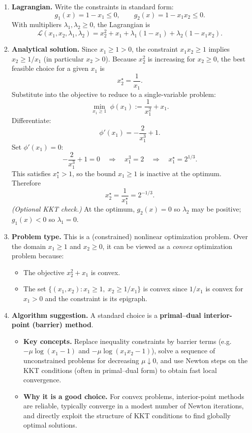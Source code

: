 \documentclass[11pt]{article}
\begin{document}
\begin{enumerate}[label=(\alph*)]

\item \textbf{Lagrangian.} Write the constraints in standard form:
\[
g_1(x)=1-x_1 \le 0,\qquad g_2(x)=1-x_1x_2 \le 0.
\]
With multipliers $\lambda_1,\lambda_2\ge 0$, the Lagrangian is
\[
\mathcal{L}(x_1,x_2,\lambda_1,\lambda_2)=x_2^2+x_1+\lambda_1(1-x_1)+\lambda_2(1-x_1x_2).
\]

\item \textbf{Analytical solution.} Since $x_1\ge 1>0$, the constraint $x_1x_2\ge 1$ implies $x_2\ge 1/x_1$ (in particular $x_2>0$). Because $x_2^2$ is increasing for $x_2\ge 0$, the best feasible choice for a given $x_1$ is
\[
x_2^\star=\frac{1}{x_1}.
\]
Substitute into the objective to reduce to a single-variable problem:
\[
\min_{x_1\ge 1}\; \phi(x_1):=\frac{1}{x_1^2}+x_1.
\]
Differentiate:
\[
\phi'(x_1)=-\frac{2}{x_1^3}+1.
\]
Set $\phi'(x_1)=0$:
\[
-\frac{2}{x_1^3}+1=0
\quad\Longrightarrow\quad
x_1^3=2
\quad\Longrightarrow\quad
x_1^\star=2^{1/3}.
\]
This satisfies $x_1^\star>1$, so the bound $x_1\ge 1$ is inactive at the optimum. Therefore
\[
x_2^\star=\frac{1}{x_1^\star}=2^{-1/3}.
\]
\emph{(Optional KKT check.)} At the optimum, $g_2(x)=0$ so $\lambda_2$ may be positive; $g_1(x)<0$ so $\lambda_1=0$.

\item \textbf{Problem type.} This is a (constrained) nonlinear optimization problem. Over the domain $x_1\ge 1$ and $x_2\ge 0$, it can be viewed as a \emph{convex} optimization problem because:
\begin{itemize}
  \item The objective $x_2^2+x_1$ is convex.
  \item The set $\{(x_1,x_2): x_1\ge 1,\; x_2\ge 1/x_1\}$ is convex since $1/x_1$ is convex for $x_1>0$ and the constraint is its epigraph.
\end{itemize}

\item \textbf{Algorithm suggestion.} A standard choice is a \textbf{primal--dual interior-point (barrier) method}.
\begin{itemize}
\item \textbf{Key concepts.} Replace inequality constraints by barrier terms (e.g. $-\mu\log(x_1-1)$ and $-\mu\log(x_1x_2-1)$), solve a sequence of unconstrained problems for decreasing $\mu\downarrow 0$, and use Newton steps on the KKT conditions (often in primal--dual form) to obtain fast local convergence.
\item \textbf{Why it is a good choice.} For convex problems, interior-point methods are reliable, typically converge in a modest number of Newton iterations, and directly exploit the structure of KKT conditions to find globally optimal solutions.
\end{itemize}

\end{enumerate}
\end{document}
